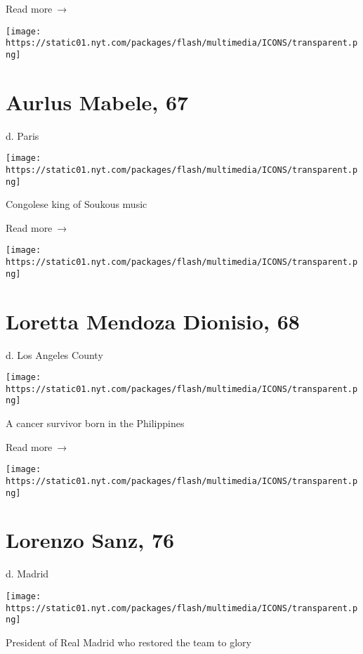  Read more~→

\href{https://www.nytimes.com/2020/03/23/world/africa/aurlus-mabele-dead-coronavirus.html}{}

\texttt{[image: https://static01.nyt.com/packages/flash/multimedia/ICONS/transparent.png]}

\hypertarget{aurlus-mabele-67}{%
\section{Aurlus Mabele, 67}\label{aurlus-mabele-67}}

d. Paris

\texttt{[image: https://static01.nyt.com/packages/flash/multimedia/ICONS/transparent.png]}

Congolese king of Soukous music

 Read more~→

\href{https://www.nytimes.com/2020/03/22/us/coronavirus-deaths-united-states.html}{}

\texttt{[image: https://static01.nyt.com/packages/flash/multimedia/ICONS/transparent.png]}

\hypertarget{loretta-mendoza-dionisio-68}{%
\section{Loretta Mendoza Dionisio,
68}\label{loretta-mendoza-dionisio-68}}

d. Los Angeles County

\texttt{[image: https://static01.nyt.com/packages/flash/multimedia/ICONS/transparent.png]}

A cancer survivor born in the Philippines

 Read more~→

\href{https://www.nytimes.com/2020/03/22/obituaries/lorenzo-sanz-dead.html}{}

\texttt{[image: https://static01.nyt.com/packages/flash/multimedia/ICONS/transparent.png]}

\hypertarget{lorenzo-sanz-76}{%
\section{Lorenzo Sanz, 76}\label{lorenzo-sanz-76}}

d. Madrid

\texttt{[image: https://static01.nyt.com/packages/flash/multimedia/ICONS/transparent.png]}

President of Real Madrid who restored the team to glory

